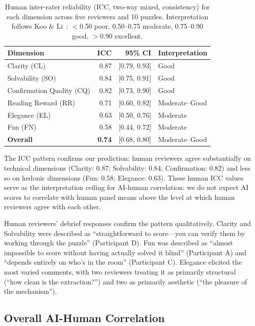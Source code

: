 \begin{table}[htbp]
\centering
\caption{Human inter-rater reliability (ICC, two-way mixed, consistency) for each dimension across five reviewers and 10 puzzles. Interpretation follows Koo \& Li~\cite{koo2016guideline}: $<$0.50 poor, 0.50--0.75 moderate, 0.75--0.90 good, $>$0.90 excellent.}
\label{tab:icc}
\begin{tabular}{@{}lrrl@{}}
\toprule
\textbf{Dimension} & \textbf{ICC} & \textbf{95\% CI} & \textbf{Interpretation} \\
\midrule
Clarity (CL)              & 0.87 & [0.79, 0.93] & Good       \\
Solvability (SO)          & 0.84 & [0.75, 0.91] & Good       \\
Confirmation Quality (CQ) & 0.82 & [0.73, 0.90] & Good       \\
Reading Reward (RR)       & 0.71 & [0.60, 0.82] & Moderate--Good \\
Elegance (EL)             & 0.63 & [0.50, 0.76] & Moderate   \\
Fun (FN)                  & 0.58 & [0.44, 0.72] & Moderate   \\
\midrule
\textbf{Overall}          & \textbf{0.74} & [0.68, 0.80] & Moderate--Good \\
\bottomrule
\end{tabular}
\end{table}

The ICC pattern confirms our prediction: human reviewers agree substantially on technical dimensions (Clarity: 0.87; Solvability: 0.84; Confirmation: 0.82) and less so on hedonic dimensions (Fun: 0.58; Elegance: 0.63). These human ICC values serve as the interpretation ceiling for AI-human correlation: we do not expect AI scores to correlate with human panel means above the level at which human reviewers agree with each other.

Human reviewers' debrief responses confirm the pattern qualitatively. Clarity and Solvability were described as ``straightforward to score---you can verify them by working through the puzzle'' (Participant D). Fun was described as ``almost impossible to score without having actually solved it blind'' (Participant A) and ``depends entirely on who's in the room'' (Participant C). Elegance elicited the most varied comments, with two reviewers treating it as primarily structural (``how clean is the extraction?'') and two as primarily aesthetic (``the pleasure of the mechanism'').

\subsection{Overall AI-Human Correlation}

